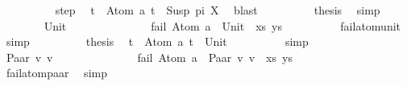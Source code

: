 \begin{isabellebody}
\ \ \ \ \ \ \ \ \isamarkupfalse%
\ step\ \isamarkupfalse%
\ {\isacartoucheopen}t{}\ {\isacharequal}{\kern0pt}\ Atom\ a{\isacartoucheclose}\ {\isacartoucheopen}t{}\ {\isacharequal}{\kern0pt}\ Susp\ pi\ X{\isacartoucheclose}\ \isamarkupfalse%
\ blast\isanewline
\ \ \ \ \ \ \isamarkupfalse%
\ \isamarkupfalse%
\ {\isacharquery}{\kern0pt}thesis\ \isamarkupfalse%
\ simp\isanewline
\ \ \ \ \isamarkupfalse%
\isanewline
\ \ \ \ \ \ \isamarkupfalse%
\ Unit\isanewline
\ \ \ \ \ \ %
\isanewline
\ \ \ \ \ \ \isamarkupfalse%
\ {\isachardoublequoteopen}fail\ {\isacharparenleft}{\kern0pt}{\isacharparenleft}{\kern0pt}Atom\ a\ {\isasymapprox}{\isacharquery}{\kern0pt}\ Unit{\isacharparenright}{\kern0pt}\ {\isacharhash}{\kern0pt}\ xs{\isacharcomma}{\kern0pt}\ ys{\isacharparenright}{\kern0pt}{\isachardoublequoteclose}\isanewline
\ \ \ \ \ \ \ \ \isamarkupfalse%
\ fail{\isacharunderscore}{\kern0pt}atom{\isacharunderscore}{\kern0pt}unit\ \isamarkupfalse%
\ simp\isanewline
\ \ \ \ \ \ \isamarkupfalse%
\ \isamarkupfalse%
\ {\isacharquery}{\kern0pt}thesis\ \isamarkupfalse%
\ {\isacartoucheopen}t{}\ {\isacharequal}{\kern0pt}\ Atom\ a{\isacartoucheclose}\ {\isacartoucheopen}t{}\ {\isacharequal}{\kern0pt}\ Unit{\isacartoucheclose}\isanewline
\ \ \ \ \ \ \ \ \isamarkupfalse%
\ simp\isanewline
\ \ \ \ \isamarkupfalse%
\isanewline
\ \ \ \ \ \ \isamarkupfalse%
\ {\isacharparenleft}{\kern0pt}Paar\ v{}\ v{}{\isacharparenright}{\kern0pt}\isanewline
\ \ \ \ \ \ %
\isanewline
\ \ \ \ \ \ \isamarkupfalse%
\ {\isachardoublequoteopen}fail\ {\isacharparenleft}{\kern0pt}{\isacharparenleft}{\kern0pt}Atom\ a\ {\isasymapprox}{\isacharquery}{\kern0pt}\ Paar\ v{}\ v{}{\isacharparenright}{\kern0pt}\ {\isacharhash}{\kern0pt}\ xs{\isacharcomma}{\kern0pt}\ ys{\isacharparenright}{\kern0pt}{\isachardoublequoteclose}\isanewline
\ \ \ \ \ \ \ \ \isamarkupfalse%
\ fail{\isacharunderscore}{\kern0pt}atom{\isacharunderscore}{\kern0pt}paar\ \isamarkupfalse%
\ simp\isanewline
\ \ \ \ \ \ \isamarkupfalse%
\ \isamarkupfalse%

\end{isabellebody}
